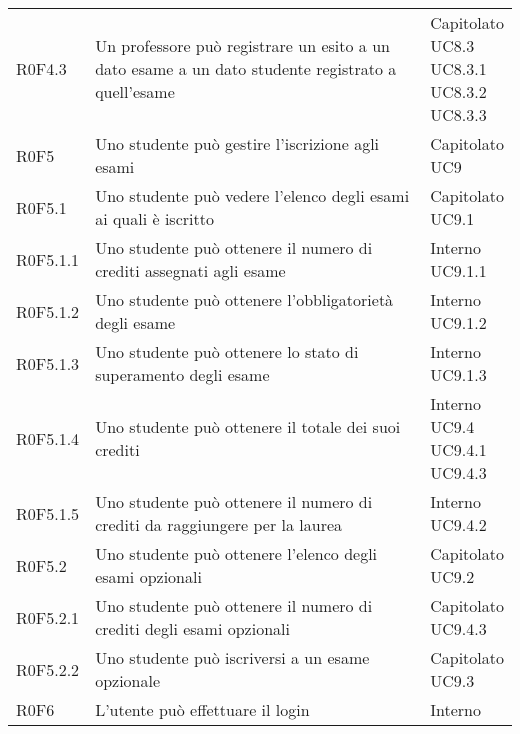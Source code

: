 \documentclass[AnalisiDeiRequisiti.tex]{subfiles}
\begin{document}
\begin{longtable}[H]{p{2cm}p{5.2cm}p{5cm}}
	R0F4.3 & Un professore può registrare un esito a un dato esame a un dato studente registrato a quell'esame & \makecell[tl]{
		Capitolato \\ 
		UC8.3 \\
		UC8.3.1 \\
		UC8.3.2 \\
		UC8.3.3
	} \\
	R0F5 & Uno studente può gestire l'iscrizione agli esami & \makecell[tl]{
		Capitolato \\ 
		UC9
	} \\
	R0F5.1 & Uno studente può vedere l'elenco degli esami ai quali è iscritto & \makecell[tl]{
		Capitolato \\ 
		UC9.1
	} \\
	R0F5.1.1 & Uno studente può ottenere il numero di crediti assegnati agli esame & \makecell[tl]{
		Interno \\ 
		UC9.1.1
	} \\
	R0F5.1.2 & Uno studente può ottenere l'obbligatorietà degli esame & \makecell[tl]{
		Interno \\ 
		UC9.1.2
	} \\
	R0F5.1.3 & Uno studente può ottenere lo stato di superamento degli esame & \makecell[tl]{
		Interno \\ 
		UC9.1.3
	} \\
	R0F5.1.4 & Uno studente può ottenere il totale dei suoi crediti & \makecell[tl]{
		Interno \\ 
		UC9.4 \\
		UC9.4.1 \\
		UC9.4.3
	} \\
	R0F5.1.5 & Uno studente può ottenere il numero di crediti da raggiungere per la laurea & \makecell[tl]{
		Interno \\
		UC9.4.2
	} \\
	R0F5.2 & Uno studente può ottenere l'elenco degli esami opzionali & \makecell[tl]{
		Capitolato \\ 
		UC9.2
	} \\
	R0F5.2.1 & Uno studente può ottenere il numero di crediti degli esami opzionali & \makecell[tl]{
		Capitolato \\ 
		UC9.4.3
	} \\
	R0F5.2.2 & Uno studente può iscriversi a un esame opzionale & \makecell[tl]{
		Capitolato \\ 
		UC9.3
	} \\
	R0F6 & L'utente può effettuare il login & \makecell[tl]{
		Interno \\ 
}
\end{longtable}
\end{document}
